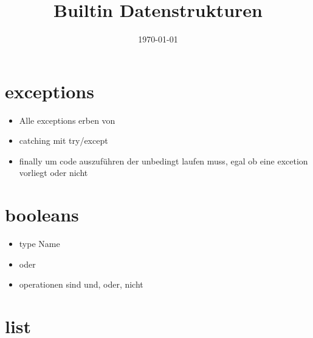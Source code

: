 
\newcommand{\topic}{
	Builtin Datenstrukturen
}

\title{\topic}
\supertitle{\course}
\date{\today}



\maketitle

\begin{frame}
	\tableofcontents
\end{frame}

\section{exceptions}
\begin{frame}
\begin{itemize}
	\item Alle exceptions erben von 
	\item catching mit try/except
	\item finally um code auszuführen der unbedingt laufen muss, egal ob eine excetion vorliegt oder nicht
\end{itemize}

\end{frame}

\section{booleans}
\begin{frame}
\begin{itemize}
	\item type Name 
	\item {} oder 
	\item operationen sind und, oder, nicht 
\end{itemize}
\end{frame}

\section{list}

